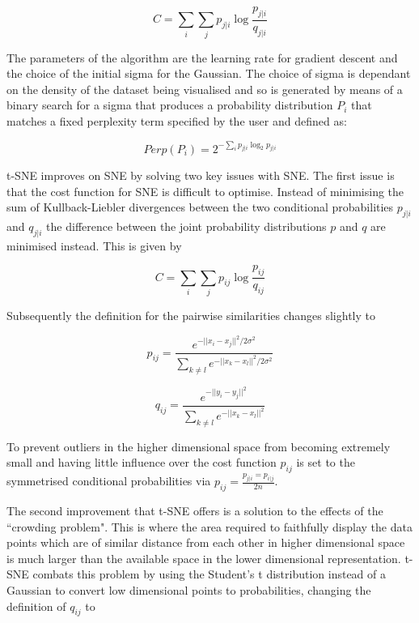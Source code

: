 \begin{equation}
	C = \sum\limits_i \sum\limits_j p_{j|i} \log \frac{p_{j|i}}{q_{j|i}}
\end{equation}

The parameters of the algorithm are the learning rate for gradient descent and the choice of the initial sigma for the Gaussian. The choice of sigma is dependant on the density of the dataset being visualised and so is generated by means of a binary search for a sigma that produces a probability distribution $P_{i}$ that matches a fixed perplexity term specified by the user and defined as:

\begin{equation}
	Perp(P_i) = 2^{- \sum\limits_i p_{j|i}\log_{2} p_{j|i}}
\end{equation}

t-SNE improves on SNE by solving two key issues with SNE. The first issue is that the cost function for SNE is difficult to optimise. Instead of minimising the sum of Kullback-Liebler divergences between the two conditional probabilities $p_{j|i}$ and $q_{j|i}$ the difference between the joint probability distributions $p$ and $q$ are minimised instead. This is given by

\begin{equation}
	C = \sum\limits_i \sum\limits_j p_{ij} \log \frac{p_{ij}}{q_{ij}}
\end{equation}

Subsequently the definition for the pairwise similarities changes slightly to

\begin{equation}
	p_{ij} = \frac{e^{-||x_i - x_j ||^2 / 2\sigma^2}}{\sum_{k\neq l} e^{-||x_k - x_l ||^2 / 2\sigma^2}}
\end{equation}

\begin{equation}
	q_{ij} = \frac{e^{-||y_i - y_j ||^2}}{\sum_{k\neq l} e^{-||x_k - x_l ||^2}}
\end{equation}

To prevent outliers in the higher dimensional space from becoming extremely small and having little influence over the cost function $p_{ij}$ is set to the symmetrised conditional probabilities via $p_{ij} = \frac{p_{j|i} = p_{i|j}}{2n}$.

The second improvement that t-SNE offers is a solution to the effects of the ``crowding problem". This is where the area required to faithfully display the data points which are of similar distance from each other in higher dimensional space is much larger than the available space in the lower dimensional representation. t-SNE combats this problem by using the Student's t distribution instead of a Gaussian to convert low dimensional points to probabilities, changing the definition of $q_{ij}$ to

